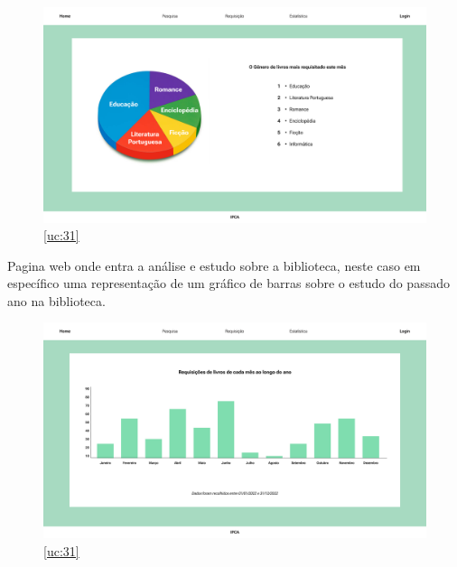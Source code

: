 \begin{figure}[H]
	\centering
	\includegraphics[width=1\linewidth]{../Mockups/PNGs/Estatistica circulo.png}  %
	\caption{\ref{uc:31}}
	\label{fig:chap230}
\end{figure}



\newpage

Pagina web onde entra a análise e estudo sobre a biblioteca, neste caso em específico uma representação de um gráfico de barras sobre o estudo do passado ano na biblioteca.

\begin{figure}[H]
	\centering
	\includegraphics[width=1\linewidth]{../Mockups/PNGs/Estatistica barras.png}  %
	\caption{\ref{uc:31}}
	\label{fig:chap230}
\end{figure}





